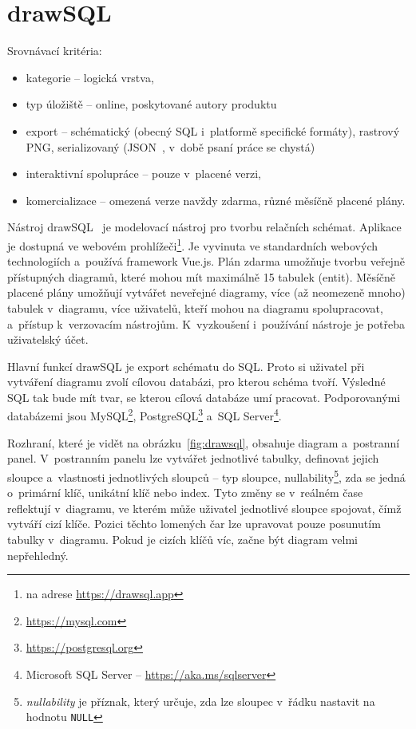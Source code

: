 \section{drawSQL}

Srovnávací kritéria:
\begin{itemize}
  \item kategorie -- logická vrstva,
  \item typ úložiště -- online, poskytované autory produktu
  \item export -- schématický (obecný SQL i~platformě specifické formáty), rastrový PNG, serializovaný (JSON~\cite{json2017}, v~době psaní práce se chystá)
  \item interaktivní spolupráce -- pouze v~placené verzi,
  \item komercializace -- omezená verze navždy zdarma, různé měsíčně placené plány.
\end{itemize}

Nástroj drawSQL~\cite{drawsql21} je modelovací nástroj pro tvorbu relačních schémat.
Aplikace je dostupná ve webovém prohlížeči\footnote{na adrese \url{https://drawsql.app}}.
Je vyvinuta ve standardních webových technologiích a~používá framework Vue.js.
Plán zdarma umožňuje tvorbu veřejně přístupných diagramů, které mohou mít maximálně 15 tabulek (entit).
Měsíčně placené plány umožňují vytvářet neveřejné diagramy, více (až neomezeně mnoho) tabulek v~diagramu, více uživatelů, kteří mohou na diagramu spolupracovat, a~přístup k~verzovacím nástrojům.
K~vyzkoušení i~používání nástroje je potřeba uživatelský účet.

Hlavní funkcí drawSQL je export schématu do SQL.
Proto si uživatel při vytváření diagramu zvolí cílovou databázi, pro kterou schéma tvoří.
Výsledné SQL tak bude mít tvar, se kterou cílová databáze umí pracovat.
Podporovanými databázemi jsou
MySQL\footnote{\url{https://mysql.com}},
PostgreSQL\footnote{\url{https://postgresql.org}}
a~SQL Server\footnote{Microsoft SQL Server -- \url{https://aka.ms/sqlserver}}.

Rozhraní, které je vidět na obrázku~\ref{fig:drawsql}, obsahuje diagram a~postranní panel.
V~postranním panelu lze vytvářet jednotlivé tabulky, definovat jejich sloupce a~vlastnosti jednotlivých sloupců -- typ sloupce,
nullability\footnote{\emph{nullability} je příznak, který určuje, zda lze sloupec v~řádku nastavit na hodnotu \texttt{NULL}},
zda se jedná o~primární klíč, unikátní klíč nebo index.
Tyto změny se v~reálném čase reflektují v~diagramu, ve kterém může uživatel jednotlivé sloupce spojovat, čímž vytváří cizí klíče.
Pozici těchto lomených čar lze upravovat pouze posunutím tabulky v~diagramu.
Pokud je cizích klíčů víc, začne být diagram velmi nepřehledný.

